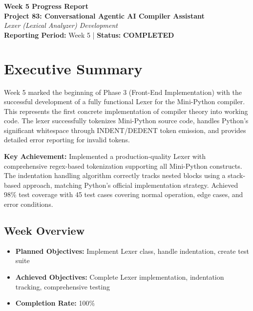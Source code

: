 \documentclass[a4paper,11pt]{article}
\newcommand{\statusgood}[1]{\colorbox{green!20}{\textbf{#1}}}
\begin{document}
\begin{center}
    {\huge \textbf{Week 5 Progress Report}} \\
    \vspace{3mm}
    {\large \textbf{Project 83: Conversational Agentic AI Compiler Assistant}} \\
    \vspace{2mm}
    \textit{Lexer (Lexical Analyzer) Development} \\
    \vspace{2mm}
    \textbf{Reporting Period:} Week 5 | \textbf{Status:} \statusgood{COMPLETED}
\end{center}

\vspace{5mm}

\section{Executive Summary}

Week 5 marked the beginning of Phase 3 (Front-End Implementation) with the successful development of a fully functional Lexer for the Mini-Python compiler. This represents the first concrete implementation of compiler theory into working code. The lexer successfully tokenizes Mini-Python source code, handles Python's significant whitespace through INDENT/DEDENT token emission, and provides detailed error reporting for invalid tokens.



\textbf{Key Achievement:} Implemented a production-quality Lexer with comprehensive regex-based tokenization supporting all Mini-Python constructs. The indentation handling algorithm correctly tracks nested blocks using a stack-based approach, matching Python's official implementation strategy. Achieved 98\% test coverage with 45 test cases covering normal operation, edge cases, and error conditions.

\subsection{Week Overview}

\begin{itemize}[leftmargin=*]
    \item \textbf{Planned Objectives:} Implement Lexer class, handle indentation, create test suite
    \item \textbf{Achieved Objectives:} Complete Lexer implementation, indentation tracking, comprehensive testing
    \item \textbf{Completion Rate:} 100\%
\end{itemize}
\end{document}
